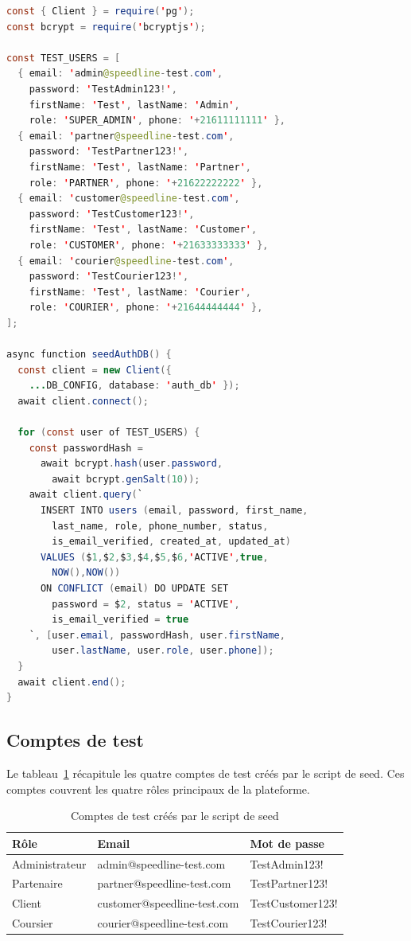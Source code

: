 \begin{lstlisting}[language=Java, caption={Script de seed -- seed-test-data.js (extrait)}, label={lst:seed-script}]
const { Client } = require('pg');
const bcrypt = require('bcryptjs');

const TEST_USERS = [
  { email: 'admin@speedline-test.com',
    password: 'TestAdmin123!',
    firstName: 'Test', lastName: 'Admin',
    role: 'SUPER_ADMIN', phone: '+21611111111' },
  { email: 'partner@speedline-test.com',
    password: 'TestPartner123!',
    firstName: 'Test', lastName: 'Partner',
    role: 'PARTNER', phone: '+21622222222' },
  { email: 'customer@speedline-test.com',
    password: 'TestCustomer123!',
    firstName: 'Test', lastName: 'Customer',
    role: 'CUSTOMER', phone: '+21633333333' },
  { email: 'courier@speedline-test.com',
    password: 'TestCourier123!',
    firstName: 'Test', lastName: 'Courier',
    role: 'COURIER', phone: '+21644444444' },
];

async function seedAuthDB() {
  const client = new Client({
    ...DB_CONFIG, database: 'auth_db' });
  await client.connect();

  for (const user of TEST_USERS) {
    const passwordHash =
      await bcrypt.hash(user.password,
        await bcrypt.genSalt(10));
    await client.query(`
      INSERT INTO users (email, password, first_name,
        last_name, role, phone_number, status,
        is_email_verified, created_at, updated_at)
      VALUES ($1,$2,$3,$4,$5,$6,'ACTIVE',true,
        NOW(),NOW())
      ON CONFLICT (email) DO UPDATE SET
        password = $2, status = 'ACTIVE',
        is_email_verified = true
    `, [user.email, passwordHash, user.firstName,
        user.lastName, user.role, user.phone]);
  }
  await client.end();
}
\end{lstlisting}

\subsection{Comptes de test}

Le tableau~\ref{tab:test-accounts} récapitule les quatre comptes de test créés par le
script de seed. Ces comptes couvrent les quatre rôles principaux de la plateforme.

\begin{table}[H]
\centering
\caption{Comptes de test créés par le script de seed}
\label{tab:test-accounts}
\begin{tabular}{l l l}
\toprule
\textbf{Rôle} & \textbf{Email} & \textbf{Mot de passe} \\
\midrule
Administrateur  & admin@speedline-test.com    & TestAdmin123! \\
Partenaire      & partner@speedline-test.com  & TestPartner123! \\
Client          & customer@speedline-test.com & TestCustomer123! \\
Coursier        & courier@speedline-test.com  & TestCourier123! \\
\bottomrule
\end{tabular}
\end{table}

